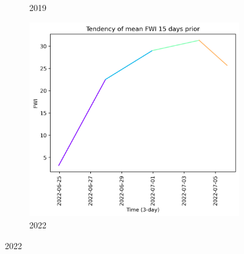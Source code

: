 \begin{figure}[h]
\begin{subfigure}{0.3\textwidth}
        \caption{2019}
        \label{fig:prior_15_days_2019}
    \end{subfigure}
    \hfill
    \begin{subfigure}{0.3\textwidth}
        \centering
        \includegraphics[width=\textwidth]{graphs/15days/2022_15daysprior_tendency_graph_FWI.png}
        \caption{2022}
        \label{fig:prior_15_days_2022}
    \end{subfigure}
    
    \label{fig:fwi_values_15days_prior}
\end{figure}

